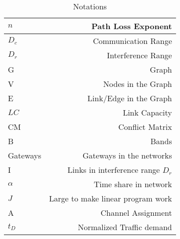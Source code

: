 \begin{table}[t] 
\centering %
\begin{tabular}{|l|r|} %
\hline %
$n$   & Path Loss Exponent     \\
\hline %
$D_c$ & Communication Range \\
\hline %
$D_r$ & Interference Range \\
\hline %
G & Graph \\
\hline %
V & Nodes in the Graph               \\
\hline %
E & Link/Edge in the Graph           \\
\hline %
$LC$ & Link Capacity                 \\
\hline %
CM & Conflict Matrix                 \\
\hline %
B& Bands                             \\
\hline %
Gateways & Gateways in the networks  \\
\hline %
I & Links in interference range $D_r$ \\
\hline %
$\alpha$& Time share in network \\
\hline %
$J$& Large to make linear program work \\
\hline
A & Channel Assignment \\
\hline %
$t_D$ & Normalized Traffic demand \\
\hline %

\end{tabular} 
\label{tab:notations} 
\caption{Notations} %
\vspace{-0.1in}
\end{table} 
